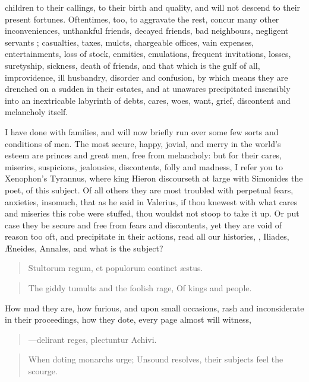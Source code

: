 children to their callings, to their birth and quality, and will
not descend to their present fortunes. Oftentimes, too, to aggravate
the rest, concur many other inconveniences, unthankful friends, decayed
friends, bad neighbours, negligent servants ; casualties, taxes, mulcts, chargeable
offices, vain expenses, entertainments, loss of stock, enmities,
emulations, frequent invitations, losses, suretyship, sickness, death
of friends, and that which is the gulf of all, improvidence, ill
husbandry, disorder and confusion, by which means they are drenched on
a sudden in their estates, and at unawares precipitated insensibly into
an inextricable labyrinth of debts, cares, woes, want, grief,
discontent and melancholy itself.

I have done with families, and will now briefly run over some few sorts
and conditions of men. The most secure, happy, jovial, and merry in the
world's esteem are princes and great men, free from melancholy: but for
their cares, miseries, suspicions, jealousies, discontents, folly and
madness, I refer you to Xenophon's Tyrannus, where king Hieron
discourseth at large with Simonides the poet, of this subject. Of all
others they are most troubled with perpetual fears, anxieties,
insomuch, that as he said in Valerius, if thou knewest with what
cares and miseries this robe were stuffed, thou wouldst not stoop to
take it up. Or put case they be secure and free from fears and
discontents, yet they are void of reason too oft, and precipitate
in their actions, read all our histories, , Iliades, \AE{}neides, Annales, and what is the subject?
%
\begin{quote}
\textlatin{Stultorum regum, et populorum continet \ae{}stus.}
\end{quote}
\translationrule
\begin{quote}
The giddy tumults and the foolish rage, Of kings and people.
\end{quote}

How mad they are, how furious, and upon small occasions, rash and
inconsiderate in their proceedings, how they dote, every page almost
will witness,
%
\begin{quote}
---\textlatin{delirant reges, plectuntur Achivi.}
\end{quote}
\translationrule
\begin{quote}
When doting monarchs urge; Unsound resolves, their subjects feel the scourge.
\end{quote}

